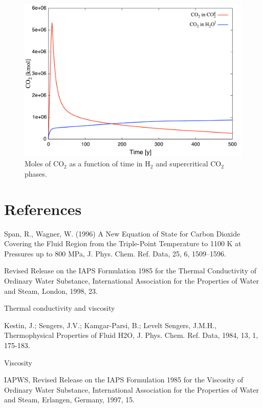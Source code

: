 \documentclass[12pt]{article}
\begin{document}
\begin{figure}\centering
\includegraphics[scale=0.45]{./figs/mass}
\caption{Moles of CO$_2$ as a function of time in H$_2$ and supercritical CO$_2$ phases.}\label{fmass}
\end{figure}

\newpage
\section{References}

Span, R., Wagner, W. (1996) A New Equation of State for Carbon Dioxide Covering the Fluid Region from the Triple-Point Temperature to 1100 K at Pressures up to 800 MPa, J. Phys. Chem. Ref. Data, 25, 6, 1509--1596.

Revised Release on the IAPS Formulation 1985 for the Thermal Conductivity of Ordinary Water Substance, International Association for the Properties of Water and Steam, London, 1998, 23. 

Thermal conductivity and viscosity

Kestin, J.; Sengers, J.V.; Kamgar-Parsi, B.; Levelt Sengers, J.M.H., Thermophysical Properties of Fluid H2O, J. Phys. Chem. Ref. Data, 1984, 13, 1, 175-183.

Viscosity

IAPWS, Revised Release on the IAPS Formulation 1985 for the Viscosity of Ordinary Water Substance, International Association for the Properties of Water and Steam, Erlangen, Germany, 1997, 15.



\end{document}
